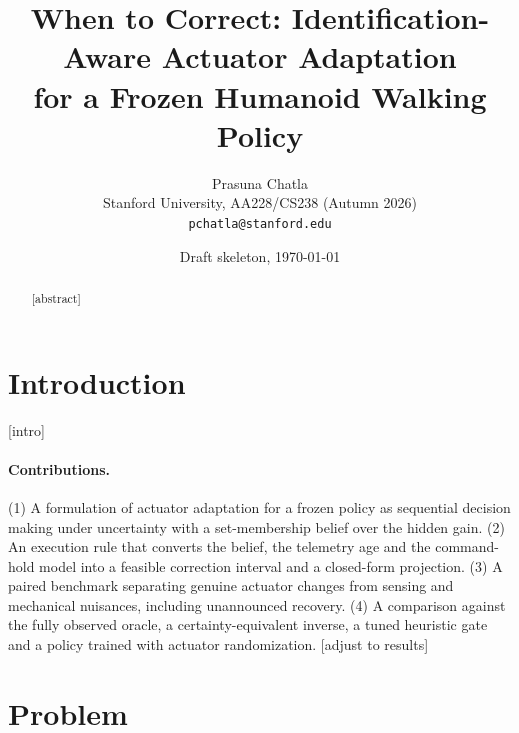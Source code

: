 \documentclass[10pt,twocolumn]{article}
\title{When to Correct: Identification-Aware Actuator Adaptation\\for a Frozen Humanoid Walking Policy}
\author{Prasuna Chatla\\ Stanford University, AA228/CS238 (Autumn 2026) \\ \texttt{pchatla@stanford.edu}}
\date{Draft skeleton, \today}
\newcommand{\todo}[1]{\textcolor{red!70!black}{[#1]}}
\begin{document}
\maketitle

\begin{abstract}
\todo{abstract}
\end{abstract}

\section{Introduction}
\todo{intro}

\paragraph{Contributions.}
(1) A formulation of actuator adaptation for a frozen policy as sequential decision making
under uncertainty with a set-membership belief over the hidden gain. (2) An execution rule that
converts the belief, the telemetry age and the command-hold model into a feasible correction
interval and a closed-form projection. (3) A paired benchmark separating genuine actuator
changes from sensing and mechanical nuisances, including unannounced recovery. (4) A
comparison against the fully observed oracle, a certainty-equivalent inverse, a tuned
heuristic gate and a policy trained with actuator randomization. \todo{adjust to results}

\section{Problem}
\end{document}
